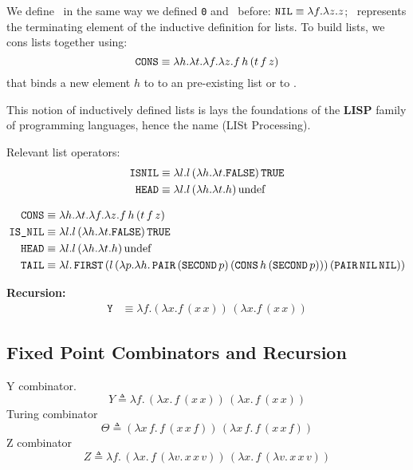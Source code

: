 \documentclass[12pt]{book}
\begin{document}
\begin{definition} We define \NIL \ in the same way we defined \texttt{0} and \FALSE \ before: $ \texttt{NIL} \equiv \lambda f.\lambda z. z $; \NIL \ represents the terminating element of the inductive definition for lists. To build lists, we cons lists together using:
  \[ \texttt{CONS} \equiv \lambda h.\lambda t.\lambda f.\lambda z. f\,h\,(t\,f\,z) \]
that binds a new element $h$ to to an pre-existing list or to \NIL.
\end{definition}
\begin{note}
  This notion of inductively defined lists is lays the foundations of the \textbf{LISP} family of programming languages, hence the name (LISt Processing).
\end{note}
\begin{definition} Relevant list operators:
\begin{align*}
  \texttt{ISNIL} &\equiv \lambda l. l\,(\lambda h.\lambda t. \texttt{FALSE})\,\texttt{TRUE} \\
  \texttt{HEAD} &\equiv \lambda l. l\,(\lambda h.\lambda t. h)\,\text{undef}
\end{align*}  
\end{definition}














\newpage
{}



\begin{align*}
  \texttt{CONS} &\equiv \lambda h.\lambda t.\lambda f.\lambda z. f\,h\,(t\,f\,z) \\
  \texttt{IS\_NIL} &\equiv \lambda l. l\,(\lambda h.\lambda t. \texttt{FALSE})\,\texttt{TRUE} \\
  \texttt{HEAD} &\equiv \lambda l. l\,(\lambda h.\lambda t. h)\,\text{undef} \\
  \texttt{TAIL} &\equiv \lambda l.\, \texttt{FIRST}\,(l\,(\lambda p.\lambda h.\, \texttt{PAIR}\,(\texttt{SECOND}\,p)\,(\texttt{CONS}\,h\,(\texttt{SECOND}\,p)))\,(\texttt{PAIR}\,\texttt{NIL}\,\texttt{NIL}))
\end{align*}




\newpage

\textbf{Recursion:}
\begin{align*}
  \texttt{Y} &\equiv \lambda f.(\lambda x. f\,(x\,x))\,(\lambda x. f\,(x\,x))
\end{align*}
\subsection{\centering Fixed Point Combinators and Recursion}
Y combinator.
\[
  Y \triangleq \lambda f.\, (\lambda x.\, f\, (x\, x))\, (\lambda x.\, f\, (x\, x))
\]
Turing combinator
\[
  \Theta \triangleq 
  (\lambda x\, f.\, f\, (x\, x\, f))\, (\lambda x\, f.\, f\, (x\, x\, f))
\]
Z combinator
\[
  Z \triangleq \lambda f.\, 
  (\lambda x.\, f\, (\lambda v.\, x\, x\, v))\, 
  (\lambda x.\, f\, (\lambda v.\, x\, x\, v))
\]
\end{document}
